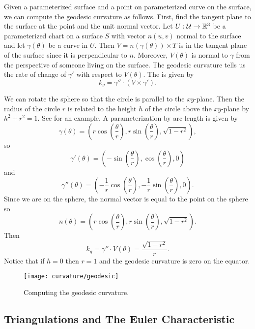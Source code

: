 Given a parameterized surface and a point on parameterized curve on the surface,
we can compute the geodesic curvature as follows.
First, find the tangent plane to the surface at the point and the unit normal vector.
Let $U:\mathcal{U}\to \mathbb{R}^3$ be a parameterized chart on a surface $S$ with vector $n(u,v)$ normal
to the surface
and let $\gamma(\theta)$ be a curve in $U$.
Then $V=n(\gamma(\theta))\times T$ is in the tangent plane of the surface since
it is perpendicular to $n$. Moreover, $V(\theta)$ is normal to $\gamma$ 
from the perspective of someone living on the surface. 
The geodesic curvature tells us the rate of change of $\gamma'$ with respect 
to $V(\theta)$.
The  is given by 
\begin{equation} \label{eqn:geodesic}
	k_g=\gamma'' \cdot (V\times \gamma').
\end{equation}

\begin{example}\label{eqn:circles-on-sphere}
	We can rotate the sphere so that the circle is parallel to the $xy$-plane.
	Then the radius of the circle $r$ is related to the height $h$ of the circle above the $xy$-plane
	by $h^2+r^2=1$. See  for an example.
	A parameterization by arc length is given by
	$$\gamma(\theta)=\left(r\cos\left(\frac{\theta}{r}\right),r\sin\left(\frac{\theta}{r}\right),\sqrt{1-r^2}\right),$$
	so
	$$\gamma'(\theta)=\left(-\sin\left(\frac{\theta}{r}\right),\cos\left(\frac{\theta}{r}\right),0\right)$$
	and
	$$\gamma''(\theta)=\left(-\frac{1}{r}\cos\left(\frac{\theta}{r}\right),-\frac{1}{r}\sin\left(\frac{\theta}{r}\right),0\right).$$
	Since we are on the sphere, the normal vector is equal to the point on the sphere
	so $$n(\theta)=\left(r\cos\left(\frac{\theta}{r}\right),r\sin\left(\frac{\theta}{r}\right),\sqrt{1-r^2}\right).$$
	Then 
	$$k_g=\gamma''\cdot V(\theta)=\frac{\sqrt{1-r^2}}{r}.$$
	Notice that if $h=0$ then $r=1$ and the geodesic curvature is zero on the equator.
\end{example}

\begin{figure}[htb]
	\centering
	\texttt{[image: curvature/geodesic]}
	\caption{Computing the geodesic curvature.}
	\label{fig:geodesic}
\end{figure}


\subsection{Triangulations and The Euler Characteristic}

